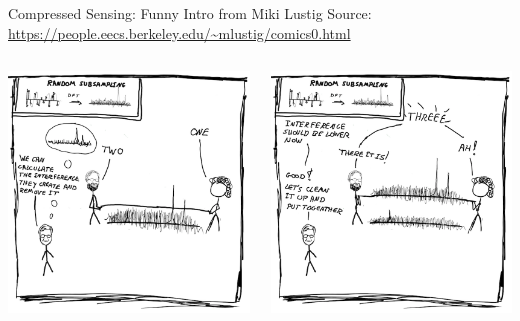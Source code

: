 \documentclass[aspectratio=169]{beamer}
\begin{document}
	\begin{frame}{Compressed Sensing: Funny Intro from Miki Lustig}
		Source: \url{https://people.eecs.berkeley.edu/~mlustig/comics0.html}
		\vspace{1em}
		\begin{columns}
			\centering
			\includegraphics[width=\columnwidth]{figures/cs-lustig-comics-21.png}
			
			\centering
			\includegraphics[width=\columnwidth]{figures/cs-lustig-comics-22.png}
		\end{columns}
	\end{frame}
	
\end{document}
